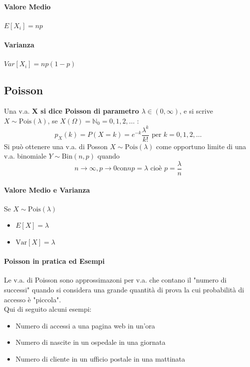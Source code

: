 \documentclass[12pt, a4paper, openany]{book}
\begin{document}
\paragraph*{Valore Medio} $E[X_i] = np$ 
\paragraph*{Varianza} $Var[X_i]=np(1-p)$

\subsection*{Poisson}
Una v.a. \textbf{X si dice Poisson di parametro $\lambda \in (0, \infty)$}, e si
scrive $X \sim \text{Pois}(\lambda)$, se $X(\Omega) = \mathbb{N}_0 = {0,1,2,\dots}$ :
\begin{equation*}
    p_X (k) = P(X=k) = e^{-k} \frac{\lambda^k}{k!} \text{ per } k = 0,1,2,\dots
\end{equation*}
Si può ottenere una v.a. di Posson $X \sim \text{Pois}(\lambda)$ come opportuno limite
di una v.a. binomiale $Y \sim \text{Bin}(n,p)$ quando
\begin{equation*}
    n \rightarrow \infty, p \rightarrow 0 \text{con} np=\lambda \text{ cioè } p = \frac{\lambda}{n}
\end{equation*}
\paragraph*{Valore Medio e Varianza}
Se $X \sim \text{Pois}(\lambda)$
\begin{itemize}
    \item $E[X] = \lambda$
    \item $\text{Var}[X] = \lambda$
\end{itemize}

\paragraph*{Poisson in pratica ed Esempi}
Le v.a. di Poisson sono approssimazoni per v.a. che contano il "numero di successi"
quando si considera una grande quantità di prova la cui probabilità di accesso è "piccola".
\\ Qui di seguito alcuni esempi: 
\begin{itemize}
    \item Numero di accessi a una pagina web in un'ora
    \item Numero di nascite in un ospedale in una giornata
    \item Numero di cliente in un ufficio postale in una mattinata
\end{itemize}
\end{document}
